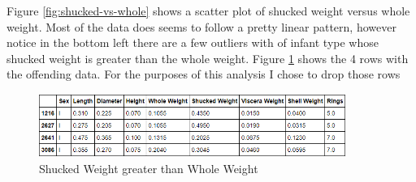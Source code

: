 Figure \ref{fig:shucked-vs-whole} shows a scatter plot of shucked weight versus whole weight. Most of the data does seems to follow a pretty linear pattern, however notice in the bottom left there are a few outliers with of infant type whose shucked weight is greater than the whole weight. Figure \ref{fig:shucked-greater-than-whole} shows the 4 rows with the offending data. For the purposes of this analysis I chose to drop those rows

\begin{figure}[H]
  \centering
  \includegraphics[scale=0.5,width=100mm]{./images/abalone-shucked-greater-than-whole.png}
  \caption{Shucked Weight greater than Whole Weight}
  \label{fig:shucked-greater-than-whole}
\end{figure}

